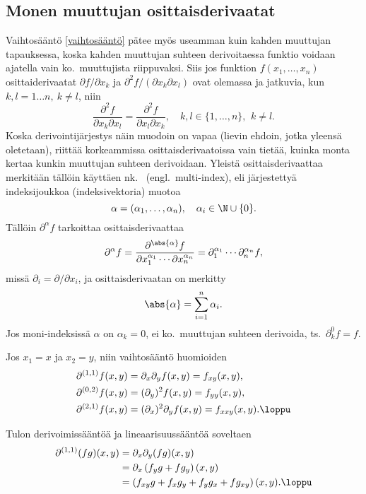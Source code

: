 \subsection{Monen muuttujan osittaisderivaatat}

Vaihtosääntö \eqref{vaihtosääntö} pätee myös useamman kuin kahden muuttujan tapauksessa, koska
kahden muuttujan suhteen derivoitaessa funktio voidaan ajatella vain ko.\ muuttujista
riippuvaksi. Siis jos funktion $f(x_1,\ldots,x_n)$ osittaiderivaatat
$\partial f/\partial x_k$ ja $\partial^2 f/(\partial x_k\partial x_l)$ ovat olemassa ja
jatkuvia, kun $k,l=1 \ldots n,\ k \neq l$, niin
\[
\frac{\partial^2 f}{\partial x_k\partial x_l}
    =\frac{\partial^2 f}{\partial x_l\partial x_k},\quad k,l\in\{1,\ldots,n\},\,\ k \neq l.
\]
Koska derivointijärjestys näin muodoin on vapaa (lievin ehdoin, jotka yleensä oletetaan),
riittää korkeammissa osittaisderivaatoissa vain tietää, kuinka monta kertaa kunkin muuttujan
suhteen derivoidaan. Yleistä osittaisderivaattaa merkitään tällöin käyttäen nk.\
 (engl.\ multi-index), eli järjestettyä indeksijoukkoa (indeksivektoria)
muotoa
\[
\alpha=(\alpha_1,\ldots,\alpha_n),\quad \alpha_i\in\N\cup\{0\}.
\]
Tällöin $\partial^\alpha f$ tarkoittaa osittaisderivaattaa
\[
\partial^\alpha f
=\frac{\partial^{\abs{\alpha}} f}{\partial x_1^{\alpha_1}\cdots\partial x_n^{\alpha_n}}
=\partial_1^{\alpha_1}\cdots\partial_n^{\alpha_n} f,
\]
%
missä $\partial_i=\partial/\partial x_i$, ja osittaisderivaatan  on merkitty
\[
\abs{\alpha}=\sum_{i=1}^n \alpha_i.
\]
Jos moni-indeksissä $\alpha$ on $\alpha_k=0$, ei ko.\ muuttujan suhteen derivoida, ts.\
$\partial_k^0 f=f$.
\begin{Exa} Jos $x_1=x$ ja $x_2=y$, niin vaihtosääntö huomioiden
\begin{align*}
\partial^{(1,1)}f(x,y)    &= \partial_x\partial_y f(x,y) = f_{xy}(x,y), \\
\partial^{(0,2)}f(x,y)    &= (\partial_y)^2 f(x,y) = f_{yy}(x,y), \\
\partial^{(2,1)}f(x,y)    &= (\partial_x)^2\partial_y f(x,y) = f_{xxy}(x,y). \loppu
\end{align*}
\end{Exa}
\begin{Exa} Tulon derivoimissääntöä ja lineaarisuussääntöä soveltaen
\begin{align*}
\partial^{(1,1)}(fg)(x,y) &= \partial_x\partial_y (fg)(x,y) \\
                         &= \partial_x\left(f_yg+fg_y\right)(x,y) \\
                         &= \left(f_{xy}g+f_xg_y+f_yg_x+fg_{xy}\right)(x,y). \loppu
\end{align*}
\end{Exa}
